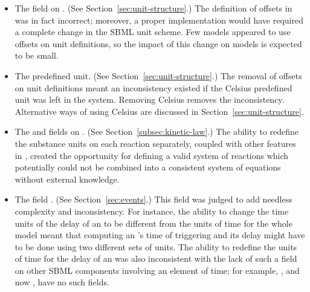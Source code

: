 \begin{itemize}
  
\item The  field on \UnitDefinition.  (See
  Section~\ref{sec:unit-structure}.)  The definition of offsets in
  \sbmltwoone was in fact incorrect; moreover, a proper
  implementation would have required a complete change in the SBML
  unit scheme.  Few models appeared to use offsets on unit
  definitions, so the impact of this change on models is expected
  to be small.
  
\item The  predefined unit.  (See
  Section~\ref{sec:unit-structure}.)  The removal of offsets on
  unit definitions meant an inconsistency existed if the Celsius
  predefined unit was left in the system.  Removing Celsius
  removes the inconsistency.  Alternative ways of using Celsius
  are discussed in Section~\ref{sec:unit-structure}.
  
\item The  and  fields on
  \KineticLaw.  (See Section~\ref{subsec:kinetic-law}.)  The
  ability to redefine the substance units on each reaction
  separately, coupled with other features in \sbmltwotwo, created
  the opportunity for defining a valid system of reactions which
  potentially could not be combined into a consistent system of
  equations without external knowledge.


\item The  field \Event.  (See
  Section~\ref{sec:events}.)  This field was judged to add
  needless complexity and inconsistency.  For instance, the
  ability to change the time units of the delay of an \Event to be
  different from the units of time for the whole model meant that
  computing an \Event's time of triggering and its delay might
  have to be done using two different sets of units.  The ability
  to redefine the units of time for the delay of an \Event was
  also inconsistent with the lack of such a field on other SBML
  components involving an element of time; for example, \RateRule,
  and now \KineticLaw, have no such fields.

\end{itemize}
